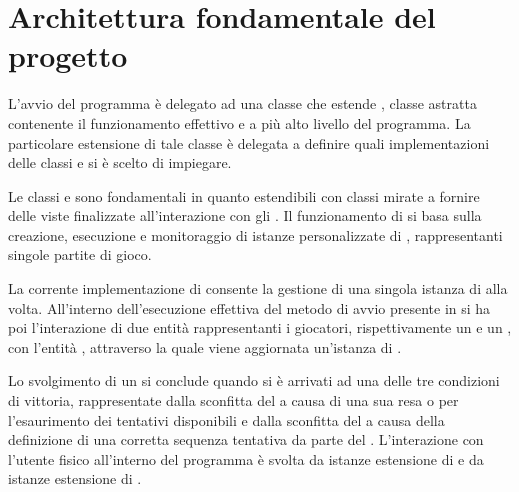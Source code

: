 \documentclass[letterpaper,10pt,italian,openany,oneside]{sphinxmanual}
\begin{document}
\section{Architettura fondamentale del progetto}
\label{\detokenize{introduzione:architettura-fondamentale-del-progetto}}
\noindent{}

L’avvio del programma è delegato ad una classe che estende , classe astratta contenente il funzionamento effettivo e a più alto livello del programma.
La particolare estensione di tale classe è delegata a definire quali implementazioni delle classi  e  si è scelto di impiegare.

Le classi  e  sono fondamentali in quanto estendibili con classi mirate a fornire delle viste finalizzate all’interazione con gli .
Il funzionamento di  si basa sulla creazione, esecuzione e monitoraggio di istanze personalizzate di , rappresentanti singole partite di gioco.

La corrente implementazione di  consente la gestione di una singola istanza di  alla volta.
All’interno dell’esecuzione effettiva del metodo di avvio presente in  si ha poi l’interazione di due entità rappresentanti i giocatori, rispettivamente
un   e un  ,
con l’entità , attraverso la quale viene aggiornata un’istanza di  .

Lo svolgimento di un  si conclude quando si è arrivati ad una delle tre condizioni di vittoria, rappresentate dalla sconfitta del  a causa di una sua resa
o per l’esaurimento dei tentativi disponibili e dalla sconfitta del  a causa della definizione di una corretta sequenza tentativa da parte del .
L’interazione con l’utente fisico all’interno del programma è svolta da istanze estensione di   e da
istanze estensione di  .
\end{document}
